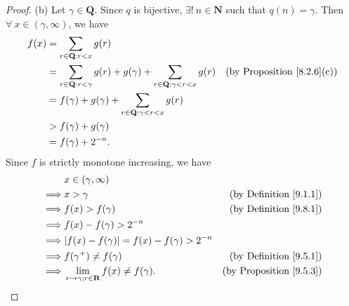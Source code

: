 \begin{proof}{(b)}
    Let \(\gamma \in \mathbf{Q}\).
    Since \(q\) is bijective, \(\exists!\ n \in \mathbf{N}\) such that \(q(n) = \gamma\).
    Then \(\forall\ x \in (\gamma, \infty)\), we have
    \begin{align*}
        f(x) & = \sum_{r \in \mathbf{Q} : r < x} g(r) \\
        & = \sum_{r \in \mathbf{Q} : r < \gamma} g(r) + g(\gamma) + \sum_{r \in \mathbf{Q} : \gamma < r < x} g(r) & \text{(by Proposition \ref{8.2.6}(c))} \\
        & = f(\gamma) + g(\gamma) + \sum_{r \in \mathbf{Q} : \gamma < r < x} g(r) \\
        & > f(\gamma) + g(\gamma) \\
        & = f(\gamma) + 2^{-n}.
    \end{align*}
    Since \(f\) is strictly monotone increasing, we have
    \begin{align*}
        & x \in (\gamma, \infty) \\
        \implies & x > \gamma & \text{(by Definition \ref{9.1.1})} \\
        \implies & f(x) > f(\gamma) & \text{(by Definition \ref{9.8.1})} \\
        \implies & f(x) - f(\gamma) > 2^{-n} \\
        \implies & \abs*{f(x) - f(\gamma)} = f(x) - f(\gamma) > 2^{-n} \\
        \implies & f(\gamma^+) \neq f(\gamma) & \text{(by Definition \ref{9.5.1})} \\
        \implies & \lim_{r \to \gamma ; r \in \mathbf{R}} f(x) \neq f(\gamma). & \text{(by Proposition \ref{9.5.3})}
    \end{align*}
\end{proof}

